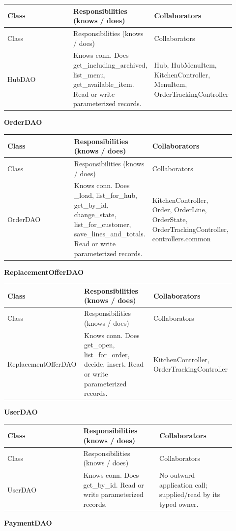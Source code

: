 \begin{longtable}{>{\raggedright\arraybackslash}p{0.3067\linewidth}>{\raggedright\arraybackslash}p{0.3067\linewidth}>{\raggedright\arraybackslash}p{0.3067\linewidth}}
Class & Responsibilities (knows / does) & Collaborators \\
\hline\endfirsthead
Class & Responsibilities (knows / does) & Collaborators \\
\hline\endhead
HubDAO & Knows conn. Does get\_including\_archived, list\_menu, get\_available\_item. Read or write parameterized records. & Hub, HubMenuItem, KitchenController, MenuItem, OrderTrackingController \\
\end{longtable}
\textbf{OrderDAO}

\begin{longtable}{>{\raggedright\arraybackslash}p{0.3067\linewidth}>{\raggedright\arraybackslash}p{0.3067\linewidth}>{\raggedright\arraybackslash}p{0.3067\linewidth}}
Class & Responsibilities (knows / does) & Collaborators \\
\hline\endfirsthead
Class & Responsibilities (knows / does) & Collaborators \\
\hline\endhead
OrderDAO & Knows conn. Does \_load, list\_for\_hub, get\_by\_id, change\_state, list\_for\_customer, save\_lines\_and\_totals. Read or write parameterized records. & KitchenController, Order, OrderLine, OrderState, OrderTrackingController, controllers.common \\
\end{longtable}
\textbf{ReplacementOfferDAO}

\begin{longtable}{>{\raggedright\arraybackslash}p{0.3067\linewidth}>{\raggedright\arraybackslash}p{0.3067\linewidth}>{\raggedright\arraybackslash}p{0.3067\linewidth}}
Class & Responsibilities (knows / does) & Collaborators \\
\hline\endfirsthead
Class & Responsibilities (knows / does) & Collaborators \\
\hline\endhead
ReplacementOfferDAO & Knows conn. Does get\_open, list\_for\_order, decide, insert. Read or write parameterized records. & KitchenController, OrderTrackingController \\
\end{longtable}
\textbf{UserDAO}

\begin{longtable}{>{\raggedright\arraybackslash}p{0.3067\linewidth}>{\raggedright\arraybackslash}p{0.3067\linewidth}>{\raggedright\arraybackslash}p{0.3067\linewidth}}
Class & Responsibilities (knows / does) & Collaborators \\
\hline\endfirsthead
Class & Responsibilities (knows / does) & Collaborators \\
\hline\endhead
UserDAO & Knows conn. Does get\_by\_id. Read or write parameterized records. & No outward application call; supplied/read by its typed owner. \\
\end{longtable}
\textbf{PaymentDAO}

